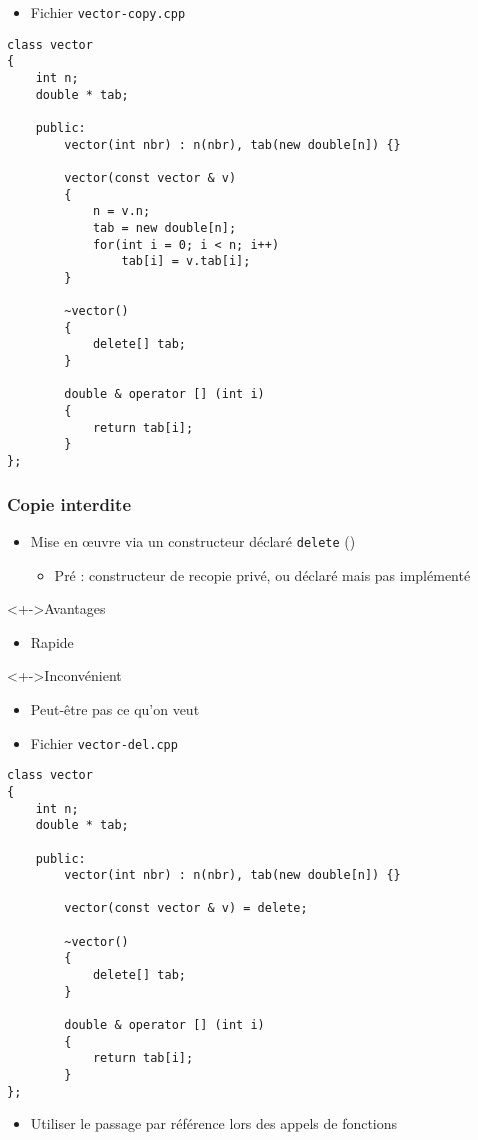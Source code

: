 \begin{frame}[containsverbatim]
\begin{itemize}
\item Fichier \texttt{vector-copy.cpp}
\end{itemize}
\begin{lstlisting}
class vector
{
	int n;
	double * tab;
	
	public:
		vector(int nbr) : n(nbr), tab(new double[n]) {}
		
		vector(const vector & v)
		{
			n = v.n;
			tab = new double[n];	
			for(int i = 0; i < n; i++)
				tab[i] = v.tab[i];		
		}
		
		~vector()
		{
			delete[] tab;
		}			

		double & operator [] (int i)
		{
			return tab[i];
		}		
};
\end{lstlisting}
\end{frame}

\begin{frame}
\frametitle{Copie interdite}
\begin{itemize}[<+->]
\item Mise en œuvre via un constructeur déclaré \lstinline|delete| ()
	\begin{itemize}
	\item Pré  : constructeur de recopie privé, ou déclaré mais pas implémenté
	\end{itemize}
\end{itemize}
\begin{exampleblock}<+->{Avantages}
	\begin{itemize}[<+->]
	\item Rapide
	\end{itemize}
\end{exampleblock}
\begin{alertblock}<+->{Inconvénient}
	\begin{itemize}[<+->]
	\item Peut-être pas ce qu'on veut
	\end{itemize}
\end{alertblock}
\end{frame}

\begin{frame}[containsverbatim]
\begin{itemize}
\item Fichier \texttt{vector-del.cpp}
\end{itemize}
\begin{lstlisting}
class vector
{
	int n;
	double * tab;
	
	public:
		vector(int nbr) : n(nbr), tab(new double[n]) {}
		
		vector(const vector & v) = delete;
		
		~vector()
		{
			delete[] tab;
		}			

		double & operator [] (int i)
		{
			return tab[i];
		}		
};
\end{lstlisting}
\begin{itemize}
\item Utiliser le passage par référence lors des appels de fonctions
\end{itemize}
\end{frame}

